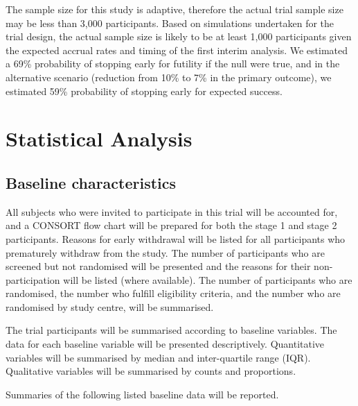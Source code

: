 \documentclass{bmcart}
\begin{document}
The sample size for this study is adaptive, therefore the actual trial sample size may be less than 3,000 participants. Based on simulations undertaken for the trial design, the actual sample size is likely to be at least 1,000 participants given the expected accrual rates and timing of the first interim analysis.
We estimated a 69\% probability of stopping early for futility if the null were true, and in the alternative scenario (reduction from 10\% to 7\% in the primary outcome), we estimated 59\% probability of stopping early for expected success.

\section*{Statistical Analysis}

\subsection*{Baseline characteristics}

All subjects who were invited to participate in this trial will be accounted for, and a CONSORT flow chart will be prepared for both the stage 1 and stage 2 participants.
Reasons for early withdrawal will be listed for all participants who prematurely withdraw from the study.
The number of participants who are screened but not randomised will be presented and the reasons for their non-participation will be listed (where available).
The number of participants who are randomised, the number who fulfill eligibility criteria, and the number who are randomised by study centre, will be summarised.

The trial participants will be summarised according to baseline variables.
The data for each baseline variable will be presented descriptively.
Quantitative variables will be summarised by median and inter-quartile range (IQR).
Qualitative variables will be summarised by counts and proportions.

Summaries of the following listed baseline data will be reported.
\end{document}
